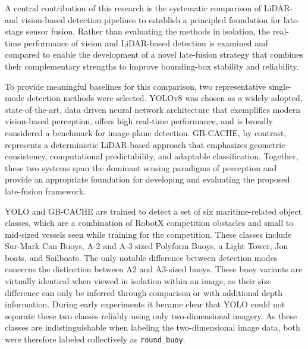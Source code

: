 \documentclass{erauthesis}
\begin{document}


A central contribution of this research is the systematic comparison of LiDAR- and vision-based detection pipelines to establish a principled foundation for late-stage sensor fusion. Rather than evaluating the methods in isolation, the real-time performance of vision and LiDAR-based detection is examined and compared to enable the development of a novel late-fusion strategy that combines their complementary strengths to improve bounding-box stability and reliability.

To provide meaningful baselines for this comparison, two representative single-mode detection methods were selected. YOLOv8 was chosen as a widely adopted, state-of-the-art, data-driven neural network architecture that exemplifies modern vision-based perception, offers high real-time performance, and is broadly considered a benchmark for image-plane detection. GB-CACHE, by contrast, represents a deterministic LiDAR-based approach that emphasizes geometric consistency, computational predictability, and adaptable classification. Together, these two systems span the dominant sensing paradigms of perception and provide an appropriate foundation for developing and evaluating the proposed late-fusion framework.

YOLO and GB-CACHE are trained to detect a set of six maritime-related object classes, which are a combination of RobotX competition obstacles and small to mid-sized vessels seen while training for the competition. 
These classes include Sur-Mark Can Buoys, A-2 and A-3 sized Polyform Buoys, a Light Tower, Jon boats, and Sailboats. 
The only notable difference between detection modes concerns the distinction between A2 and A3-sized buoys.  
These buoy variants are virtually identical when viewed in isolation within an image, as their size difference can only be inferred through comparison or with additional depth information.
During early experiments it became clear that YOLO could not separate these two classes reliably using only two-dimensional imagery.
As these classes are indistinguishable when labeling the two-dimensional image data, both were therefore labeled collectively as \texttt{round\_buoy}.
\end{document}
